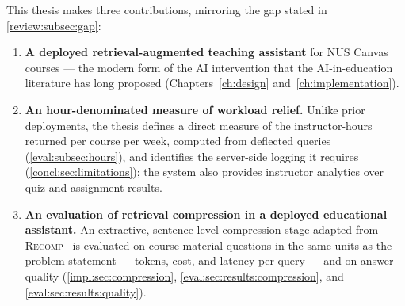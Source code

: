 This thesis makes three contributions, mirroring the gap stated in
\autoref{review:subsec:gap}:
\begin{enumerate}
    \item \textbf{A deployed retrieval-augmented teaching assistant} for NUS
          Canvas courses --- the modern form of the AI intervention
          that the AI-in-education literature has long proposed
          (Chapters~\ref{ch:design} and~\ref{ch:implementation}).
    \item \textbf{An hour-denominated measure of workload relief.} Unlike
          prior deployments, the thesis defines a direct measure of the
          instructor-hours returned per course per week, computed from
          deflected queries (\autoref{eval:subsec:hours}), and identifies the
          server-side logging it requires (\autoref{concl:sec:limitations});
          the system also provides instructor analytics over quiz and
          assignment results.
    \item \textbf{An evaluation of retrieval compression in a deployed
          educational assistant.} An extractive, sentence-level compression
          stage adapted from \textsc{Recomp}~\cite{iclr24:Xu} is evaluated
          on course-material questions in the same units as the problem
          statement --- tokens, cost, and latency per query --- and on answer
          quality (\autoref{impl:sec:compression},
          \autoref{eval:sec:results:compression}, and
          \autoref{eval:sec:results:quality}).
\end{enumerate}
